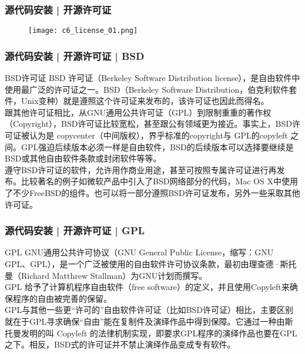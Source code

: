\begin{frame}
  \frametitle{源代码安装 | 开源许可证}
  \begin{figure}
    \centering
    \texttt{[image: c6\_license\_01.png]}
  \end{figure}
\end{frame}

\begin{frame}
  \frametitle{源代码安装 | 开源许可证 | BSD}
  \begin{block}{BSD许可证}
    \alert{BSD} 许可证（Berkeley Software Distribution license），是自由软件中使用最广泛的许可证之一。BSD（Berkeley Software Distribution，伯克利软件套件，Unix变种）就是遵照这个许可证来发布的，该许可证也因此而得名。\\
    跟其他许可证相比，从GNU通用公共许可证（GPL）到限制重重的著作权（Copyright），BSD许可证比较宽松，甚至跟公有领域更为接近。事实上，BSD许可证被认为是 \alert{copycenter}（中间版权），界乎标准的copyright与 \alert{GPL的copyleft} 之间。GPL强迫后续版本必须一样是自由软件，BSD的后续版本可以选择要继续是BSD或其他自由软件条款或封闭软件等等。\\
    遵守BSD许可证的软件，允许用作商业用途，甚至可按照专属许可证进行再发布。比较著名的例子如微软产品中引入了BSD网络部分的代码，Mac OS X中使用了不少FreeBSD的组件。也可以将一部分遵照BSD许可证发布，另外一些采取其他许可证。
  \end{block}
\end{frame}

\begin{frame}
  \frametitle{源代码安装 | 开源许可证 | GPL}
  \begin{block}{GPL}
    GNU通用公共许可协议（GNU General Public License，缩写：GNU GPL、GPL），是一个广泛被使用的自由软件许可协议条款，最初由理查德·斯托曼（Richard Matthrew Stallman）为GNU计划而撰写。\\
    \vspace{0.5em}
    \alert{GPL} 给予了计算机程序自由软件（free software）的定义，并且使用Copyleft来确保程序的自由被完善的保留。\\
    \vspace{0.5em}
    GPL与其他一些更“许可的”自由软件许可证（比如BSD许可证）相比，主要区别就在于GPL寻求确保“自由”能在复制件及演绎作品中得到保障。它通过一种由斯托曼发明的叫 \alert{Copyleft} 的法律机制实现，即要求GPL程序的演绎作品也要在GPL之下。相反，BSD式的许可证并不禁止演绎作品变成专有软件。
  \end{block}
\end{frame}

